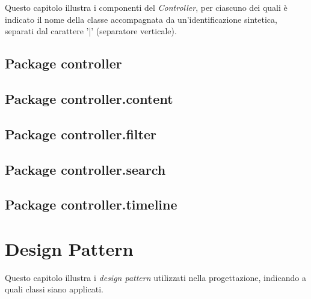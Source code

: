 \documentclass[10pt,a4paper,headinclude,footinclude,hidelinks]{scrreprt} %
\begin{document}
	Questo capitolo illustra i componenti del \textit{Controller}, per ciascuno dei quali è indicato il nome della classe accompagnata da un'identificazione sintetica, separati dal carattere '|' (separatore verticale).

	\section{Package controller}
	\label{ch:stage:design:sistema:controller}


	\section{Package controller.content}
	\label{ch:stage:design:sistema:controller.content}

	\section{Package controller.filter}
	\label{ch:stage:design:sistema:controller.filter}

	\section{Package controller.search}
	\label{ch:stage:design:sistema:controller.search}

	\section{Package controller.timeline}
	\label{ch:stage:design:sistema:controller.timeline}

	\chapter{Design Pattern}
	\label{ch:stage:design:pattern}
	Questo capitolo illustra i \textit{design pattern} utilizzati nella progettazione, indicando a quali classi siano applicati.
\end{document}
